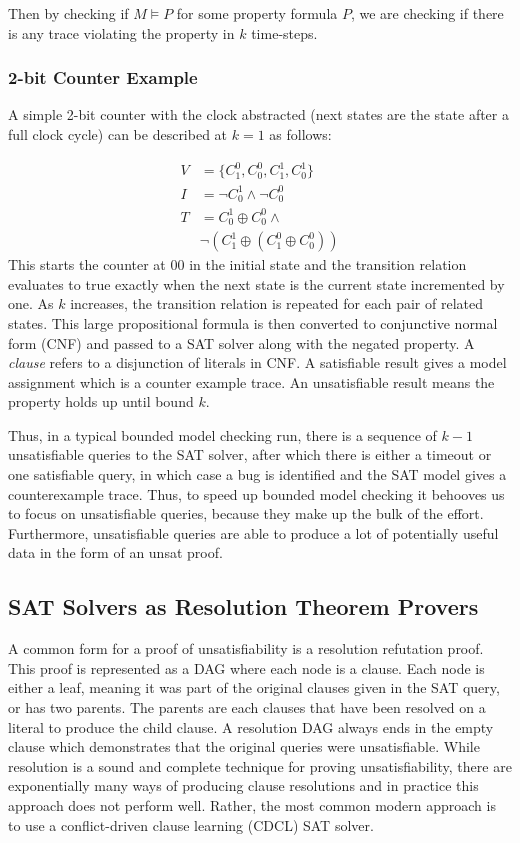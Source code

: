 \documentclass[letterpaper]{article} %
\begin{document}
Then by checking if $M \models P$ for some property formula $P$, we are checking if there is any trace violating the property in $k$ time-steps.

\subsubsection{2-bit Counter Example}

A simple 2-bit counter with the clock abstracted (next states are the state after a full clock cycle) can be described at $k=1$ as follows:

\begin{equation*}
\begin{split}
V &= \{C_1^0, C_0^0, C_1^1, C_0^1\} \\
I &= \neg C_0^1 \wedge \neg C_0^0 \\
T &= C_0^1 \oplus C_0^0 \wedge \\
& \neg (C_1^1 \oplus (C_1^0 \oplus C_0^0))
\end{split}
\end{equation*}
This starts the counter at $00$ in the initial state and the transition relation evaluates to true exactly when the next state is the current state incremented by one. As $k$ increases, the transition relation is repeated for each pair of related states. This large propositional formula is then converted to conjunctive normal form (CNF) and passed to a SAT solver along with the negated property. A \textit{clause} refers to a disjunction of literals in CNF. A satisfiable result gives a model assignment which is a counter example trace. An unsatisfiable result means the property holds up until bound $k$.  

Thus, in a typical bounded model checking run, there is a sequence of $k-1$ unsatisfiable queries to the SAT solver, after which there is either a timeout or one satisfiable query, in which case a bug is identified and the SAT model gives a counterexample trace. Thus, to speed up bounded model checking it behooves us to focus on unsatisfiable queries, because they make up the bulk of the effort. Furthermore, unsatisfiable queries are able to produce a lot of potentially useful data in the form of an unsat proof.

\subsection{SAT Solvers as Resolution Theorem Provers}

A common form for a proof of unsatisfiability is a resolution refutation proof. This proof is represented as a DAG where each node is a clause. Each node is either a leaf, meaning it was part of the original clauses given in the SAT query, or has two parents. The parents are each clauses that have been resolved on a literal to produce the child clause. A resolution DAG always ends in the empty clause which demonstrates that the original queries were unsatisfiable. While resolution is a sound and complete technique for proving unsatisfiability, there are exponentially many ways of producing clause resolutions and in practice this approach does not perform well. Rather, the most common modern approach is to use a conflict-driven clause learning (CDCL) SAT solver.
\end{document}
